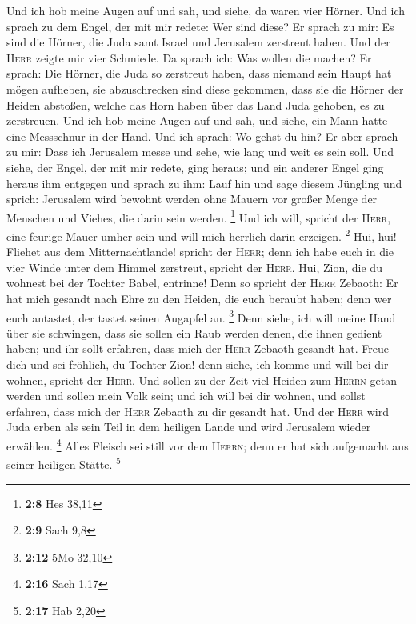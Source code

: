  Und ich hob meine Augen auf und sah, und siehe, da waren
vier Hörner.  Und ich sprach zu dem Engel, der mit mir
redete: Wer sind diese? Er sprach zu mir: Es sind die Hörner, die Juda
samt Israel und Jerusalem zerstreut haben.  Und der
\textsc{Herr} zeigte mir vier Schmiede.  Da sprach ich:
Was wollen die machen? Er sprach: Die Hörner, die Juda so zerstreut
haben, dass niemand sein Haupt hat mögen aufheben, sie abzuschrecken
sind diese gekommen, dass sie die Hörner der Heiden abstoßen, welche das
Horn haben über das Land Juda gehoben, es zu zerstreuen. 
Und ich hob meine Augen auf und sah, und siehe, ein Mann hatte eine
Messschnur in der Hand.  Und ich sprach: Wo gehst du hin?
Er aber sprach zu mir: Dass ich Jerusalem messe und sehe, wie lang und
weit es sein soll.  Und siehe, der Engel, der mit mir
redete, ging heraus; und ein anderer Engel ging heraus ihm entgegen
 und sprach zu ihm: Lauf hin und sage diesem Jüngling und
sprich: Jerusalem wird bewohnt werden ohne Mauern vor großer Menge der
Menschen und Viehes, die darin sein werden. \footnote{\textbf{2:8} Hes
  38,11}  Und ich will, spricht der \textsc{Herr}, eine
feurige Mauer umher sein und will mich herrlich darin erzeigen.
\footnote{\textbf{2:9} Sach 9,8}  Hui, hui! Fliehet aus
dem Mitternachtlande! spricht der \textsc{Herr}; denn ich habe euch in
die vier Winde unter dem Himmel zerstreut, spricht der \textsc{Herr}.
 Hui, Zion, die du wohnest bei der Tochter Babel,
entrinne!  Denn so spricht der \textsc{Herr} Zebaoth: Er
hat mich gesandt nach Ehre zu den Heiden, die euch beraubt haben; denn
wer euch antastet, der tastet seinen Augapfel an. \footnote{\textbf{2:12}
  5Mo 32,10}  Denn siehe, ich will meine Hand über sie
schwingen, dass sie sollen ein Raub werden denen, die ihnen gedient
haben; und ihr sollt erfahren, dass mich der \textsc{Herr} Zebaoth
gesandt hat.  Freue dich und sei fröhlich, du Tochter
Zion! denn siehe, ich komme und will bei dir wohnen, spricht der
\textsc{Herr}.  Und sollen zu der Zeit viel Heiden zum
\textsc{Herrn} getan werden und sollen mein Volk sein; und ich will bei
dir wohnen, und sollst erfahren, dass mich der \textsc{Herr} Zebaoth zu
dir gesandt hat.  Und der \textsc{Herr} wird Juda erben
als sein Teil in dem heiligen Lande und wird Jerusalem wieder erwählen.
\footnote{\textbf{2:16} Sach 1,17}  Alles Fleisch sei
still vor dem \textsc{Herrn}; denn er hat sich aufgemacht aus seiner
heiligen Stätte. \footnote{\textbf{2:17} Hab 2,20}

